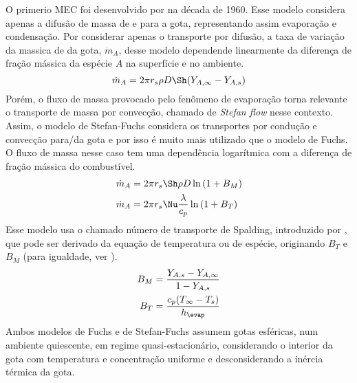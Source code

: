 
O primerio MEC foi desenvolvido por \cite{Fuchs1959} na década de 1960. 
Esse modelo considera apenas a difusão de massa de e para a gota, representando assim evaporação e condensação.
Por considerar apenas o transporte por difusão, a taxa de variação da  massica de da gota, $\dot m_A$, desse modelo dependende linearmente da diferença de fração mássica da espécie $A$ na superfície e no ambiente.
\begin{equation}
    \dot m_A = 2 \pi r_s \rho D \Sh (Y_{A,\infty} - Y_{A,s}) \label{eq:maxwell}
\end{equation}
Porém, o fluxo de massa provocado pelo fenômeno de evaporação torna relevante o transporte de massa por convecção, chamado de \emph{Stefan flow} nesse contexto. 
Assim, o modelo de Stefan-Fuchs considera os transportes por condução e convecção para/da gota e por isso é muito mais utilizado que o modelo de Fuchs.
O fluxo de massa nesse caso tem uma dependência logarítmica com a diferença de fração mássica do combustível. \cite{Glassman2008, Turns2000}
\begin{align}
    \dot m_{A} &= 2 \pi r_s \Sh \rho D \ln{(1 + B_M)}              \label{eq:m_evap_BM} \\
    \dot m_A   &= 2 \pi r_s \Nu \frac{\lambda}{c_p} \ln{(1 + B_T)} \label{eq:m_evap_BT}
\end{align}
Esse modelo usa o chamado número de transporte de Spalding, introduzido por , que pode ser derivado da equação de temperatura ou de espécie, originando $B_T$ e $B_M$ (para igualdade, ver \cite{Glassman2008}).
\begin{align}
    B_M &= \frac{Y_{A,s} - Y_{A,\infty}}{1 - Y_{A,s}} \label{eq:B_M} \\
    B_T &= \frac{c_p (T_\infty - T_s)}{h_\evap}       \label{eq:B_T}
\end{align} 
Ambos modelos de Fuchs e de Stefan-Fuchs assumem gotas esféricas, num ambiente quiescente, em regime quasi-estacionário, considerando o interior da gota com temperatura e concentração uniforme e desconsiderando a inércia térmica da gota. 

